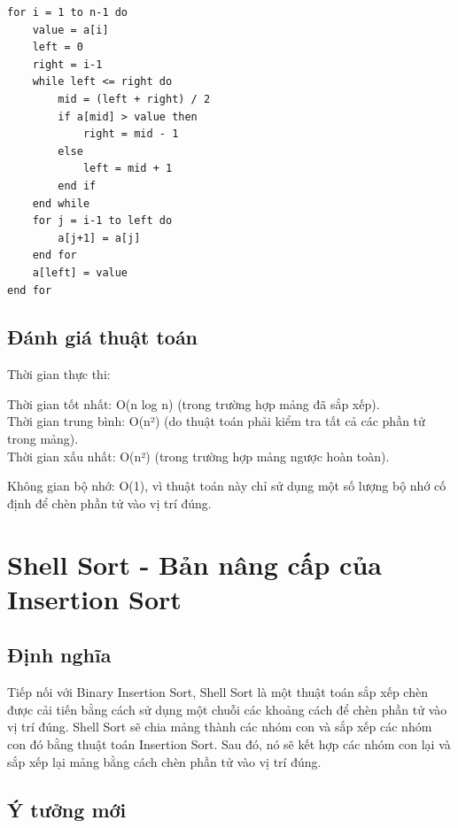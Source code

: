 \documentclass[12pt,a4paper]{report}
\begin{document}
\begin{lstlisting}
for i = 1 to n-1 do
    value = a[i]
    left = 0
    right = i-1
    while left <= right do
        mid = (left + right) / 2
        if a[mid] > value then
            right = mid - 1
        else
            left = mid + 1
        end if
    end while
    for j = i-1 to left do
        a[j+1] = a[j]
    end for
    a[left] = value
end for
\end{lstlisting}

\subsection{ Đánh giá thuật toán}

{Thời gian thực thi:

\hspace{0.5cm} Thời gian tốt nhất: O(n log n) (trong trường hợp mảng đã sắp xếp).\\

\hspace{0.5cm} Thời gian trung bình: O(n²) (do thuật toán phải kiểm tra tất cả các phần tử trong mảng).\\

\hspace{0.5cm} Thời gian xấu nhất: O(n²) (trong trường hợp mảng ngược hoàn toàn).\\}

{Không gian bộ nhớ: O(1), vì thuật toán này chỉ sử dụng một số lượng bộ nhớ cố định để chèn phần tử vào vị trí đúng.}

\section{ Shell Sort - Bản nâng cấp của Insertion Sort}
 
\subsection{ Định nghĩa}

{\large \hspace{1cm} Tiếp nối với Binary Insertion Sort, Shell Sort là một thuật toán sắp xếp chèn được cải tiến bằng cách sử dụng một chuỗi các khoảng cách để chèn phần tử vào vị trí đúng. Shell Sort sẽ chia mảng thành các nhóm con và sắp xếp các nhóm con đó bằng thuật toán Insertion Sort. Sau đó, nó sẽ kết hợp các nhóm con lại và sắp xếp lại mảng bằng cách chèn phần tử vào vị trí đúng.}

\subsection {Ý tưởng mới}
\end{document}
